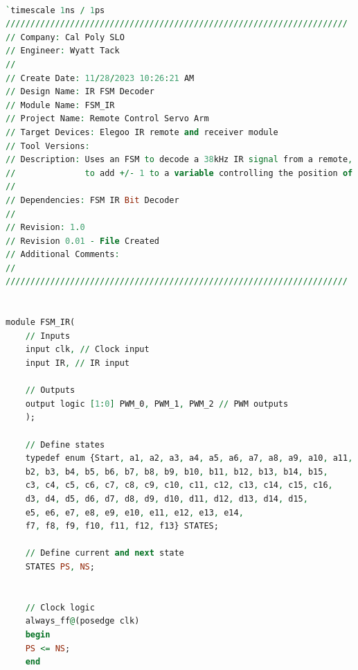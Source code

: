 \documentclass[
    a4paper, %
	12pt, %
    ]{CSSullivanBusinessReport}
\begin{document}
\begin{lstlisting}[language=VHDL]

`timescale 1ns / 1ps
/////////////////////////////////////////////////////////////////////
// Company: Cal Poly SLO
// Engineer: Wyatt Tack
// 
// Create Date: 11/28/2023 10:26:21 AM
// Design Name: IR FSM Decoder
// Module Name: FSM_IR
// Project Name: Remote Control Servo Arm
// Target Devices: Elegoo IR remote and receiver module
// Tool Versions: 
// Description: Uses an FSM to decode a 38kHz IR signal from a remote, 
//              to add +/- 1 to a variable controlling the position of a servo motor
// 
// Dependencies: FSM IR Bit Decoder
// 
// Revision: 1.0
// Revision 0.01 - File Created
// Additional Comments:
// 
/////////////////////////////////////////////////////////////////////


module FSM_IR(
    // Inputs
    input clk, // Clock input
    input IR, // IR input

    // Outputs
    output logic [1:0] PWM_0, PWM_1, PWM_2 // PWM outputs
    );
    
    // Define states
    typedef enum {Start, a1, a2, a3, a4, a5, a6, a7, a8, a9, a10, a11, a12, a13, a14, a15, a16, 
    b2, b3, b4, b5, b6, b7, b8, b9, b10, b11, b12, b13, b14, b15, 
    c3, c4, c5, c6, c7, c8, c9, c10, c11, c12, c13, c14, c15, c16, 
    d3, d4, d5, d6, d7, d8, d9, d10, d11, d12, d13, d14, d15, 
    e5, e6, e7, e8, e9, e10, e11, e12, e13, e14, 
    f7, f8, f9, f10, f11, f12, f13} STATES;
    
    // Define current and next state
    STATES PS, NS;
    

    // Clock logic
    always_ff@(posedge clk)
    begin
    PS <= NS;
    end
    

\end{lstlisting}
\end{document}
